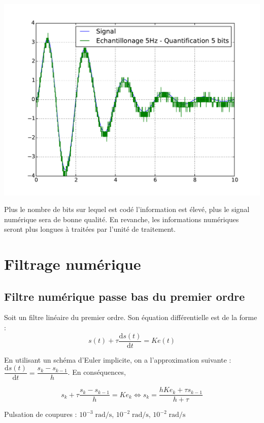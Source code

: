 \documentclass[10pt,fleqn]{article} %
\begin{document}
\begin{minipage}[c]{.32\linewidth}
\begin{center}
\includegraphics[width=\textwidth]{images/quan_3}
\end{center}
\end{minipage}

Plus le nombre de bits sur lequel est codé l'information est élevé, plus le signal numérique sera de bonne qualité. En revanche, les informations numériques seront plus longues à traitées par l'unité de traitement.

\section{Filtrage numérique}
\subsection{Filtre numérique passe bas du premier ordre}
Soit un filtre linéaire du premier ordre. Son équation différentielle est de la forme :
$$
s(t)+\tau \dfrac{\text{d} s(t) }{\text{d}t} = K e(t)
$$

En utilisant un schéma d'Euler implicite, on a l'approximation suivante : $\dfrac{\text{d} s(t) }{\text{d}t} = \dfrac{s_{k}-s_{k-1}}{h}$. En conséquences, 

$$
s_k+\tau \dfrac{s_{k}-s_{k-1}}{h} = K e_k \Leftrightarrow 
s_k = \dfrac{h K e_k+\tau s_{k-1}}{h+\tau}
$$

Pulsation de coupures : $10^{-3}\; \text{rad/s}$, $10^{-2}\; \text{rad/s}$, $10^{-2}\; \text{rad/s}$
\end{document}
